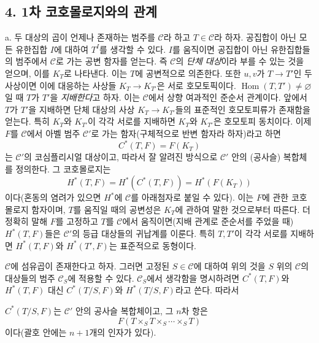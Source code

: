 \documentclass[11pt,twoside,openany]{book}
\numberwithin{equation}{section}
\newcommand{\sourceunit}{front}
\newcommand{\src}[1]{%
  \phantomsection\hypertarget{src:\sourceunit:#1}{}%
  \marginpar{\raggedleft\footnotesize\sffamily #1}%
}
\theoremstyle{plain}
\theoremstyle{definition}
\theoremstyle{remark}
\begin{document}
\subsection*{4. 1차 코호몰로지와의 관계}

\medskip\noindent
a. 두 대상의 곱이 언제나 존재하는 범주를 $\mathcal C$라 하고
$T\in\mathcal C$라 하자. 공집합이 아닌 모든 유한집합 $I$에 대하여
$T^I$를 생각할 수 있다. $I$를 움직이면 공집합이 아닌 유한집합들의
범주에서 $\mathcal C$로 가는 공변 함자를 얻는다. 즉 $\mathcal C$의
\emph{단체 대상}이라 부를 수 있는 것을 얻으며, 이를 $K_T$로 나타낸다.
이는 $T$에 공변적으로 의존한다. 또한 $u,v$가 $T\longrightarrow T'$인 두
사상이면 이에 대응하는 사상들 $K_T\longrightarrow K_{T'}$은 서로
호모토픽이다. $\operatorname{Hom}(T,T')\ne\varnothing$일 때 $T$가 $T'$을
\emph{지배한다}고 하자. 이는 $\mathcal C$에서 상향 여과적인 준순서
관계이다. 앞에서 $T$가 $T'$을 지배하면 단체 대상의 사상
$K_T\longrightarrow K_{T'}$들의 표준적인 호모토피류가 존재함을 얻는다.
특히 $K_T$와 $K_{T'}$이 각각 서로를 지배하면 $K_T$와 $K_{T'}$은
호모토피 동치이다. 이제 $F$를 $\mathcal C$에서 아벨 범주
$\mathcal C'$로 가는 함자(구체적으로 반변 함자라 하자)라고 하면
\[
  C^*(T,F)=F(K_T)
\]
는 $\mathcal C'$의 코심플리시얼 대상이고, 따라서 잘 알려진 방식으로
$\mathcal C'$ 안의 (공사슬) 복합체를 정의한다. 그 코호몰로지는
\[
  H^*(T,F)=H^*(C^*(T,F))=H^*(F(K_T))
\]
이다(혼동의 염려가 있으면 $H^*$에 $\mathcal C$를 아래첨자로 붙일 수
있다). 이는 $F$에 관한 코호몰로지 함자이며, $T$를 움직일 때의 공변성은
$K_T$에 관하여 말한 것으로부터 따른다. 더 정확히 말해 $F$를 고정하고
$T$를 $\mathcal C$에서 움직이면(지배 관계로 준순서를 주었을 때)
$H^*(T,F)$들은 $\mathcal C'$의 등급 대상들의 귀납계를 이룬다. 특히
$T,T'$이 각각 서로를 지배하면 $H^*(T,F)$와 $H^*(T',F)$는 표준적으로
동형이다.

$\mathcal C$에 섬유곱이 존재한다고 하자. 그러면 고정된
$S\in\mathcal C$에 대하여 위의 것을 $S$ 위의 $\mathcal C$의 대상들의
범주 $\mathcal C_S$에 적용할 수 있다. $\mathcal C_S$에서 생각함을
명시하려면 $C^*(T,F)$와 $H^*(T,F)$ 대신 $C^*(T/S,F)$와
$H^*(T/S,F)$라고 쓴다. 따라서

\src{311}
$C^*(T/S,F)$는 $\mathcal C'$ 안의 공사슬 복합체이고, 그 $n$차 항은
\[
  F(T\times_ST\times_S\cdots\times_ST)
\]
이다(괄호 안에는 $n+1$개의 인자가 있다).
\end{document}
